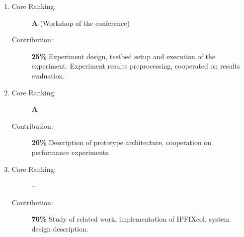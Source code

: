 \begin{enumerate}
  \item {}
  \begin{description}
    \item[Core Ranking:] \textbf{A} (Workshop of the conference)
    \item[Contribution:] \textbf{25\%} Experiment design, testbed setup and execution of the experiment. Experiment results preprocessing, cooperated on results evaluation.
  \end{description}
  
  \item {}
  \begin{description}
    \item[Core Ranking:] \textbf{A}
    \item[Contribution:] \textbf{20\%} Description of prototype architecture, cooperation on performance experiments.
  \end{description}
  
  \item {}
  \begin{description}
    \item[Core Ranking:] --
    \item[Contribution:] \textbf{70\%} Study of related work, implementation of IPFIXcol, system design description.
  \end{description}

\end{enumerate}


